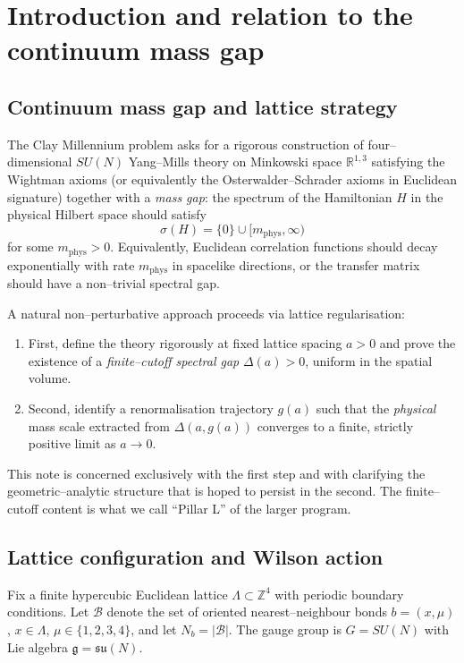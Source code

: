 \documentclass[11pt]{article}
\numberwithin{equation}{section}
\begin{document}
\tableofcontents

\section{Introduction and relation to the continuum mass gap}

\subsection{Continuum mass gap and lattice strategy}

The Clay Millennium problem asks for a rigorous construction of
four--dimensional $SU(N)$ Yang--Mills theory on Minkowski space
$\mathbb{R}^{1,3}$ satisfying the Wightman axioms (or equivalently the
Osterwalder--Schrader axioms in Euclidean signature) together with a
\emph{mass gap}: the spectrum of the Hamiltonian $H$ in the physical
Hilbert space should satisfy
\[
  \sigma(H) = \{0\} \cup [m_{\mathrm{phys}},\infty)
\]
for some $m_{\mathrm{phys}}>0$.  Equivalently, Euclidean correlation
functions should decay exponentially with rate $m_{\mathrm{phys}}$ in
spacelike directions, or the transfer matrix should have a non--trivial
spectral gap.

A natural non--perturbative approach proceeds via lattice
regularisation:

\begin{enumerate}
  \item First, define the theory rigorously at fixed lattice spacing
  $a>0$ and prove the existence of a \emph{finite--cutoff spectral gap}
  $\Delta(a)>0$, uniform in the spatial volume.

  \item Second, identify a renormalisation trajectory $g(a)$ such that
  the \emph{physical} mass scale extracted from $\Delta(a,g(a))$
  converges to a finite, strictly positive limit as $a\to 0$.
\end{enumerate}

This note is concerned exclusively with the first step and with
clarifying the geometric--analytic structure that is hoped to persist in
the second.  The finite--cutoff content is what we call ``Pillar L'' of
the larger program.

\subsection{Lattice configuration and Wilson action}

Fix a finite hypercubic Euclidean lattice $\Lambda\subset\mathbb{Z}^4$
with periodic boundary conditions.  Let $\mathcal{B}$ denote the set of
oriented nearest--neighbour bonds $b=(x,\mu)$, $x\in\Lambda$,
$\mu\in\{1,2,3,4\}$, and let $N_b = |\mathcal{B}|$.  The gauge group is
$G = SU(N)$ with Lie algebra $\mathfrak{g} = \mathfrak{su}(N)$.
\end{document}
